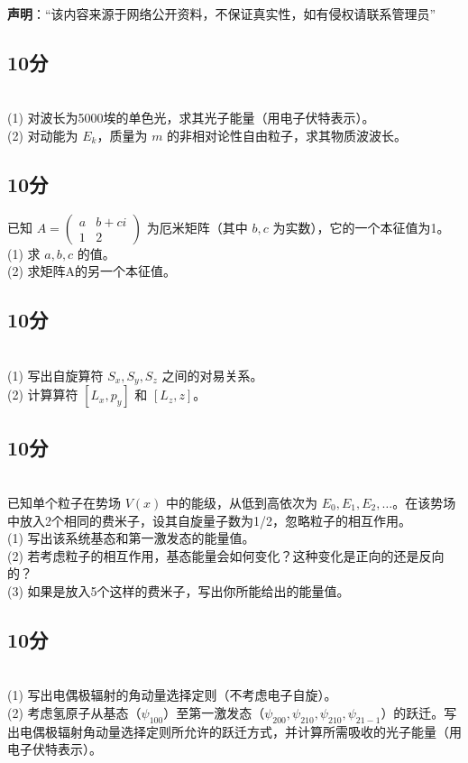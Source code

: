 
\textbf{声明}：“该内容来源于网络公开资料，不保证真实性，如有侵权请联系管理员”

\subsection{10分}\\
(1) 对波长为5000埃的单色光，求其光子能量（用电子伏特表示）。\\
(2) 对动能为 $E_k$，质量为 $m$ 的非相对论性自由粒子，求其物质波波长。
\subsection{10分}
已知 $A = \begin{pmatrix} a & b+ci \\ 1 & 2 \end{pmatrix}$ 为厄米矩阵（其中 $ b, c$ 为实数），它的一个本征值为1。\\
(1) 求 $a, b, c$ 的值。\\
(2) 求矩阵A的另一个本征值。
\subsection{10分}\\
(1) 写出自旋算符 $S_x, S_y, S_z$ 之间的对易关系。\\
(2) 计算算符 $[L_x, p_y]$ 和 $[L_z, z]$。
\subsection{10分}\\
已知单个粒子在势场 $V(x)$ 中的能级，从低到高依次为 $E_0, E_1, E_2, \dots$。在该势场中放入2个相同的费米子，设其自旋量子数为1/2，忽略粒子的相互作用。\\
(1) 写出该系统基态和第一激发态的能量值。\\
(2) 若考虑粒子的相互作用，基态能量会如何变化？这种变化是正向的还是反向的？\\
(3) 如果是放入5个这样的费米子，写出你所能给出的能量值。
\subsection{10分}\\
(1) 写出电偶极辐射的角动量选择定则（不考虑电子自旋）。\\
(2) 考虑氢原子从基态（$\psi_{100}$）至第一激发态（$\psi_{200}, \psi_{210},\psi_{210}, \psi_{21-1}$）的跃迁。写出电偶极辐射角动量选择定则所允许的跃迁方式，并计算所需吸收的光子能量（用电子伏特表示）。
